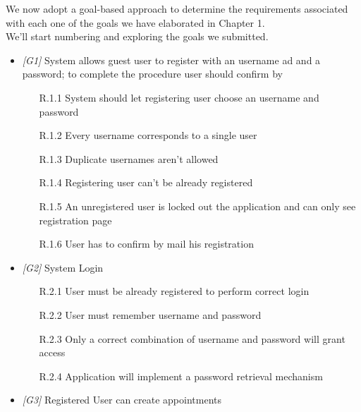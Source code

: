 We now adopt a goal-based approach to determine the requirements associated with each one of the goals we have elaborated in Chapter 1.\\
We'll start numbering and exploring the goals we submitted.

\begin{itemize}

            \item \textit{[G1]} System allows guest user to register with an username ad and a password; to complete the procedure user should confirm by 
               
                  \begin{itemize}
                        \item [R.1.1] System should let registering user choose an username and password
                        \item [R.1.2] Every username corresponds to a single user
                        \item [R.1.3] Duplicate usernames aren’t allowed
                        \item [R.1.4] Registering user can't be already registered
                        \item [R.1.5] An unregistered user is locked out the application and can only see registration page
                        \item [R.1.6] User has to confirm by mail his registration
                  \end{itemize}
             
\item \textit{[G2]} System Login

                  \begin{itemize}
                        \item [R.2.1] User must be already registered to perform correct login
                        \item [R.2.2] User must remember username and password
                        \item [R.2.3] Only a correct combination of username and password will grant access
                        \item [R.2.4] Application will implement a password retrieval mechanism
                  \end{itemize}
                  
\item \textit{[G3]} Registered User can create appointments 


\end{itemize}
